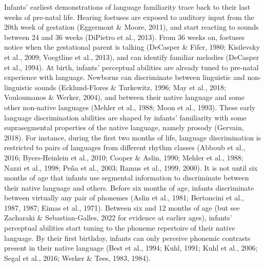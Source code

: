 \documentclass[
  12pt,
  b5paperpaper,
  twoside]{scrreprt}
\begin{document}
Infants' earliest demonstrations of language familiarity trace back to
their last weeks of pre-natal life. Hearing foetuses are exposed to
auditory input from the 20th week of gestation (Eggermont \& Moore,
2011), and start reacting to sounds between 24 and 36 weeks (DiPietro et
al., 2013). From 36 weeks on, foetuses notice when the gestational
parent is talking (DeCasper \& Fifer, 1980; Kisilevsky et al., 2009;
Voegtline et al., 2013), and can identify familiar melodies (DeCasper et
al., 1994). At birth, infants' perceptual abilities are already tuned to
pre-natal experience with language. Newborns can discriminate between
linguistic and non-linguistic sounds (Ecklund-Flores \& Turkewitz, 1996;
May et al., 2018; Vouloumanos \& Werker, 2004), and between their native
language and some other non-native languages (Mehler et al., 1988; Moon
et al., 1993). These early language discrimination abilities are shaped
by infants' familiarity with some suprasegmental properties of the
native language, namely prosody (Gervain, 2018). For instance, during
the first two months of life, language discrimination is restricted to
pairs of languages from different rhythm classes (Abboub et al., 2016;
Byers-Heinlein et al., 2010; Cooper \& Aslin, 1990; Mehler et al., 1988;
Nazzi et al., 1998; Peña et al., 2003; Ramus et al., 1999, 2000). It is
not until six months of age that infants use segmental information to
discriminate between their native language and others. Before six months
of age, infants discriminate between virtually any pair of phonemes
(Aslin et al., 1981; Bertoncini et al., 1987, 1987; Eimas et al., 1971).
Between six and 12 months of age (but see Zacharaki \& Sebastian-Galles,
2022 for evidence at earlier ages), infants' perceptual abilities start
tuning to the phoneme repertoire of their native language. By their
first birthday, infants can only perceive phonemic contrasts present in
their native language (Best et al., 1994; Kuhl, 1991; Kuhl et al., 2006;
Segal et al., 2016; Werker \& Tees, 1983, 1984).
\end{document}

